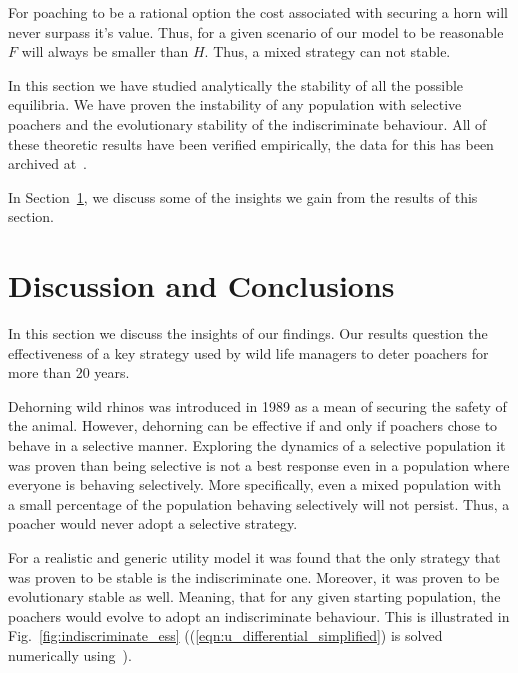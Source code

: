 \documentclass[10pt]{article}
\begin{document}
For poaching to be a rational option the cost associated with securing a horn
will never surpass it's value.
Thus, for a given scenario of our model
to be reasonable \(F\) will always be smaller than \(H\). Thus, a mixed strategy
can not stable.

In this section we have studied analytically the stability of all the possible
equilibria. We have proven the instability of any population with selective
poachers
and the evolutionary stability of the indiscriminate behaviour. 
All of these theoretic results have been verified empirically, the data for this
has been archived at~\cite{}.

In Section~\ref{section:discussion}, we discuss some of the insights we
gain from the results of this section.

\section{Discussion and Conclusions}
\label{section:discussion}

In this section we discuss the insights of our findings. Our results question
the effectiveness of a key strategy used by wild life managers to deter poachers
for more than 20 years. 

Dehorning wild rhinos was introduced in 1989 as a mean of securing the
safety of the animal. However, dehorning can be effective if and only if
poachers chose to behave in a selective manner. Exploring the
dynamics of a selective population it was proven than being selective is not
a best response even in a population where everyone is behaving selectively.
More specifically, even a mixed population with a small percentage of the 
population behaving selectively will not persist. Thus, a poacher would never
adopt a selective strategy. 

For a realistic and generic utility model it was found that
the only strategy that was proven to be stable is the indiscriminate one.
Moreover, it was proven to be evolutionary stable as well. Meaning, 
that for any given starting population, the poachers would evolve to adopt an
indiscriminate behaviour. This is illustrated in 
Fig.~\ref{fig:indiscriminate_ess} ((\ref{eqn:u_differential_simplified}) is 
solved numerically using~\cite{scipy}).
\end{document}
